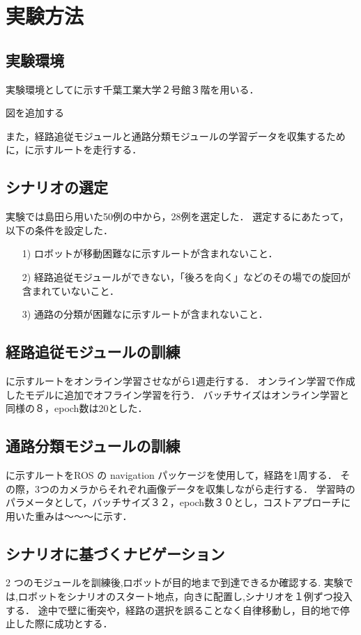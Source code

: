 \section{実験方法}
\subsection{実験環境}
実験環境として\figuref{}に示す千葉工業大学２号館３階を用いる．

図を追加する

また，経路追従モジュールと通路分類モジュールの学習データを収集するために，\figuref{}に示すルートを走行する．

\subsection{シナリオの選定}
実験では島田ら用いた50例の中から，28例を選定した．
選定するにあたって，以下の条件を設定した．

\begin{enumerate}
  \item [1)] ロボットが移動困難な\figuref{}に示すルートが含まれないこと．
  \item [2)] 経路追従モジュールができない，「後ろを向く」などのその場での旋回が含まれていないこと．
  \item [3)] 通路の分類が困難な\figuref{}に示すルートが含まれないこと．
\end{enumerate}

\subsection{経路追従モジュールの訓練}
\figuref{}に示すルートをオンライン学習させながら1週走行する．
オンライン学習で作成したモデルに追加でオフライン学習を行う．
バッチサイズはオンライン学習と同様の８，epoch数は20とした．

\subsection{通路分類モジュールの訓練}
\figuref{}に示すルートをROS の navigation パッケージを使用して，経路を1周する．
その際，3つのカメラからそれぞれ画像データを収集しながら走行する．
学習時のパラメータとして，バッチサイズ３２，epoch数３０とし，コストアプローチに用いた重みは～～～に示す．

\subsection{シナリオに基づくナビゲーション}
2 つのモジュールを訓練後,ロボットが目的地まで到達できるか確認する.
実験では,ロボットをシナリオのスタート地点，向きに配置し,シナリオを１例ずつ投入する．
途中で壁に衝突や，経路の選択を誤ることなく自律移動し，目的地で停止した際に成功とする．